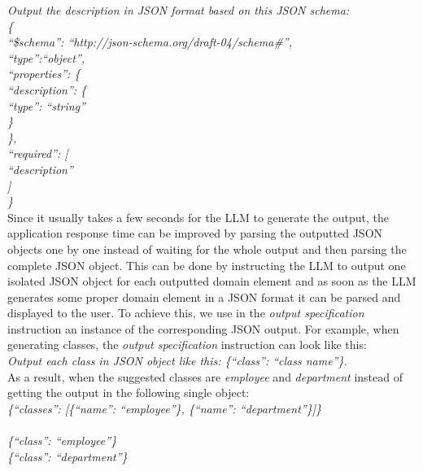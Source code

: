 \noindent{}\textit{Output the description in JSON format based on this JSON schema: \\
\{ \\
\null \quad ``\$schema'': ``http://json-schema.org/draft-04/schema\#'', \\
\null \quad  ``type'':``object'', \\
\null \quad  ``properties'': \{ \\
\null \quad \quad ``description'': \{ \\
\null \quad \quad \quad ``type'': ``string'' \\
\null \quad \quad   \} \\
\null \quad  \}, \\
\null \quad  ``required'': [ \\
\null \quad \quad   ``description'' \\
\null \quad  ] \\
\}} \\


Since it usually takes a few seconds for the LLM to generate the output, the application response time can be improved by parsing the outputted JSON objects one by one instead of waiting for the whole output and then parsing the complete JSON object. This can be done by instructing the LLM to output one isolated JSON object for each outputted domain element and as soon as the LLM generates some proper domain element in a JSON format it can be parsed and displayed to the user. To achieve this, we use in the \emph{output specification} instruction an instance of the corresponding JSON output. For example, when generating classes, the \emph{output specification} instruction can look like this: \\

\noindent{}\textit{Output each class in JSON object like this: \{``class'': ``class name''\}.} \\

\noindent{}As a result, when the suggested classes are \textit{employee} and \textit{department} instead of getting the output in the following single object: \\

\noindent{}\textit{\{``classes'': [\{``name'': ``employee''\}, \{``name'': ``department''\}]\}} \\

 \\

\noindent{}\textit{\{``class'': ``employee''\} \\
\{``class'': ``department''\}}


